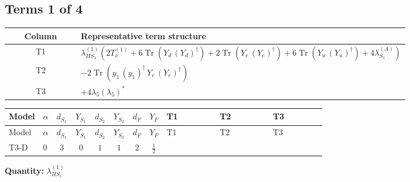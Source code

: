 \documentclass[8pt]{article}
\begin{document}
\begin{landscape}
\subsection*{Terms 1 of 4}
\begin{center}
\begin{tabular}{@{}c >{\raggedright\arraybackslash}p{0.82\linewidth}@{}}
\toprule
Column & Representative term structure \\
\midrule
T1 & \(\displaystyle {\lambda_{HS_1}^{(1)}} (2 T_{\nu}^{(1)}+6 \operatorname{Tr}\!\left({Y_d}\,\left({Y_d}\right)^{\dagger}\right)+2 \operatorname{Tr}\!\left({Y_e}\,\left({Y_e}\right)^{\dagger}\right)+6 \operatorname{Tr}\!\left({Y_u}\,\left({Y_u}\right)^{\dagger}\right)+4 {\lambda_{S_1}^{(A)}})\) \\
\midrule
T2 & \(\displaystyle -2 \operatorname{Tr}\!\left({y_1}\,\left({y_1}\right)^{\dagger}\,{Y_e}\,\left({Y_e}\right)^{\dagger}\right)\) \\
\midrule
T3 & \(\displaystyle +4 {\lambda_5} \left({\lambda_5}\right)^{*}\) \\
\midrule
\bottomrule
\end{tabular}
\end{center}
\smallskip
\tiny
\begin{longtable}{@{}llcccccc >{\raggedright\arraybackslash}p{0.21\linewidth} >{\raggedright\arraybackslash}p{0.21\linewidth} >{\raggedright\arraybackslash}p{0.21\linewidth}@{}}
\toprule
Model & $\alpha$ & $d_{S_1}$ & $Y_{S_1}$ & $d_{S_2}$ & $Y_{S_2}$ & $d_F$ & $Y_F$ & T1 & T2 & T3 \\
\midrule
\endfirsthead
\toprule
Model & $\alpha$ & $d_{S_1}$ & $Y_{S_1}$ & $d_{S_2}$ & $Y_{S_2}$ & $d_F$ & $Y_F$ & T1 & T2 & T3 \\
\midrule
\endhead
T3-D & $0$ & $3$ & $0$ & $1$ & $1$ & $2$ & $\frac{1}{2}$ & \scriptsize\adjustbox{max width=\linewidth}{$\begin{gathered} {\lambda_{HS_1}^{(1)}} (2 T_{\nu}^{(1)}+6 \operatorname{Tr}\!\left({Y_d}\,\left({Y_d}\right)^{\dagger}\right)+2 \operatorname{Tr}\!\left({Y_e}\,\left({Y_e}\right)^{\dagger}\right)+6 \operatorname{Tr}\!\left({Y_u}\,\left({Y_u}\right)^{\dagger}\right)+4 {\lambda_{S_1}^{(A)}})\end{gathered}$} & \scriptsize\adjustbox{max width=\linewidth}{$\begin{gathered} -2 \operatorname{Tr}\!\left({y_1}\,\left({y_1}\right)^{\dagger}\,{Y_e}\,\left({Y_e}\right)^{\dagger}\right)\end{gathered}$} & \scriptsize\adjustbox{max width=\linewidth}{$\begin{gathered} +4 {\lambda_5} \left({\lambda_5}\right)^{*}\end{gathered}$} \\
\midrule
\bottomrule
\end{longtable}
\clearpage
\noindent\textbf{Quantity: }$\lambda_{HS_1}^{(1)}$\par\smallskip

\end{landscape}
\end{document}

